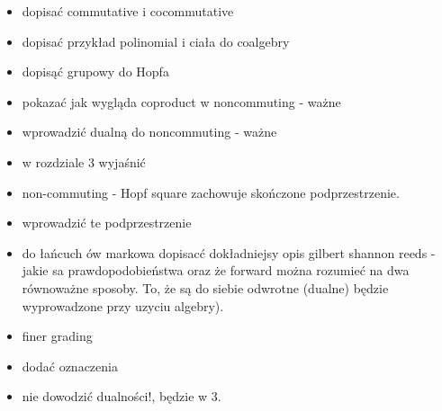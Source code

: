 \documentclass[a4paper]{article}
\begin{document}
\todo{}
\begin{itemize}
\item dopisać commutative i cocommutative
\item dopisać przykład polinomial i ciała do coalgebry
\item dopisąć grupowy do Hopfa
\item pokazać jak wygląda coproduct w noncommuting - ważne
\item wprowadzić dualną do noncommuting - ważne
\item w rozdziale 3 wyjaśnić
\item non-commuting - Hopf square zachowuje skończone podprzestrzenie.
\item wprowadzić te podprzestrzenie
\item do łańcuch ów markowa dopisacć dokładniejsy opis gilbert shannon reeds - jakie sa prawdopodobieństwa
oraz że forward można rozumieć na dwa równoważne sposoby. To, że są do siebie odwrotne (dualne) będzie
wyprowadzone przy uzyciu algebry).
\item finer grading
\item dodać oznaczenia
\item nie dowodzić dualności!, będzie w 3.
\end{itemize}
\end{document}

